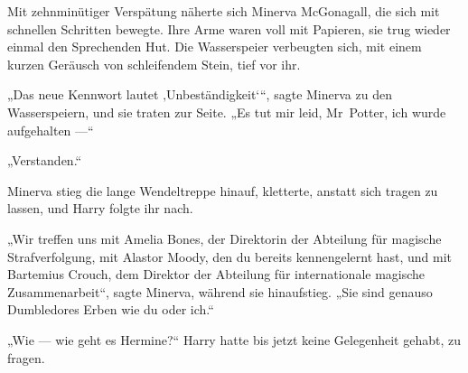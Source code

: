 Mit zehnminütiger Verspätung näherte sich Minerva McGonagall, die sich mit schnellen Schritten bewegte. Ihre Arme waren voll mit Papieren, sie trug wieder einmal den Sprechenden Hut. Die Wasserspeier verbeugten sich, mit einem kurzen Geräusch von schleifendem Stein, tief vor ihr.

„Das neue Kennwort lautet ‚Unbeständigkeit‘“, sagte Minerva zu den Wasserspeiern, und sie traten zur Seite.
„Es tut mir leid, Mr~Potter, ich wurde aufgehalten —“

„Verstanden.“

Minerva stieg die lange Wendeltreppe hinauf, kletterte, anstatt sich tragen zu lassen, und Harry folgte ihr nach.

„Wir treffen uns mit Amelia Bones, der Direktorin der Abteilung für magische Strafverfolgung, mit Alastor Moody, den du bereits kennengelernt hast, und mit Bartemius Crouch, dem Direktor der Abteilung für internationale magische Zusammenarbeit“, sagte Minerva, während sie hinaufstieg.
„Sie sind genauso Dumbledores Erben wie du oder ich.“

„Wie — wie geht es Hermine?“
Harry hatte bis jetzt keine Gelegenheit gehabt, zu fragen.

